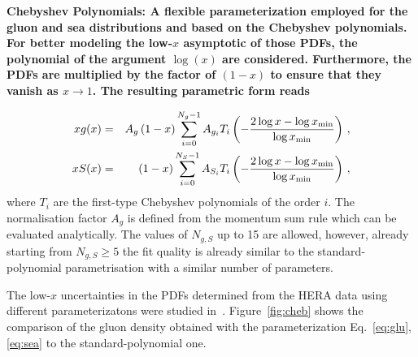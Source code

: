 \begin{description}
\item \bf {Chebyshev Polynomials:} \rm
A flexible parameterization employed for the gluon and sea distributions
and based on the Chebyshev polynomials.
For better modeling the low-$x$ asymptotic of those PDFs, the polynomial of the argument $\log(x)$ are considered.
Furthermore, the PDFs are multiplied
by the factor of $(1-x)$ to ensure that they vanish as $x\to 1$. The resulting parametric form reads

{ \small
\begin{eqnarray}
x g(x) &=& A_g \left(1-x\right) \sum_{i=0}^{N_g-1} A_{g_i} T_i \left(-\frac{\textstyle 2\log x - \log x_{\rm min} } {\textstyle \log x_{\rm min} } \right)\,, \label{eq:glu} \\
x S(x) &=& \left(1-x\right) \sum_{i=0}^{N_S-1} A_{S_i} T_i \left(-\frac{\textstyle 2\log x - \log x_{\rm min} } {\textstyle \log x_{\rm min} } \right)\,, \label{eq:sea} 
\end{eqnarray}
}
where $T_i$ are the first-type Chebyshev polynomials of the order $i$.
The normalisation factor $A_g$ is defined from the momentum sum rule which
can be evaluated analytically.
The values of $N_{g,S}$ up to 15 are allowed, however, already starting from $N_{g,S} \ge 5$ 
the fit quality is already similar
to the standard-polynomial parametrisation with a similar number of parameters.
%

%
The low-$x$ uncertainties in the PDFs determined from the HERA data using different 
parameterizatons were studied in~\cite{Chebyshev}. Figure~\ref{fig:cheb} shows the comparison 
of the gluon density obtained with the parameterization Eq.~\ref{eq:glu},\ref{eq:sea} to 
the standard-polynomial one.


\end{description}
